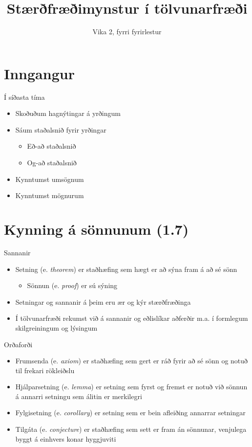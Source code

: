\documentclass{beamer}
\title{Stærðfræðimynstur í tölvunarfræði}
\subtitle{Vika 2, fyrri fyrirlestur}
\begin{document}
\begin{frame}
    \titlepage
\end{frame}

\section{Inngangur}

\begin{frame}{Í síðasta tíma}
    \begin{itemize}
        \item Skoðuðum hagnýtingar á yrðingum
        \item Sáum staðalsnið fyrir yrðingar
        \begin{itemize}
            \item Eð-að staðalsnið
            \item Og-að staðalsnið
        \end{itemize}
        \item Kynntumst umsögnum
        \item Kynntumst mögnurum
    \end{itemize}
\end{frame}

\section{Kynning á sönnunum (1.7)}

\begin{frame}{Sannanir}
    \begin{itemize}
        \item Setning (e. \emph{theorem}) er staðhæfing sem hægt er að sýna fram á að sé sönn
        \begin{itemize}
            \item Sönnun (e. \emph{proof}) er sú sýning
        \end{itemize}
        \item Setningar og sannanir á þeim eru ær og kýr stærðfræðinga
        \item Í tölvunarfræði rekumst við á sannanir og eðlislíkar aðferðir m.a. í formlegum skilgreiningum og lýsingum
    \end{itemize}
\end{frame}

\begin{frame}{Orðaforði}
    \begin{itemize}
        \item Frumsenda (e. \emph{axiom}) er staðhæfing sem gert er ráð fyrir að sé sönn og notuð til frekari rökleiðslu
        \item Hjálparsetning (e. \emph{lemma}) er setning sem fyrst og fremst er notuð við sönnun á annarri setningu sem álitin er merkilegri
        \item Fylgisetning (e. \emph{corollary}) er setning sem er bein afleiðing annarrar setningar
        \item Tilgáta (e. \emph{conjecture}) er staðhæfing sem sett er fram án sönnunar, venjulega byggt á einhvers konar hyggjuviti
    \end{itemize}
\end{frame}
\end{document}
